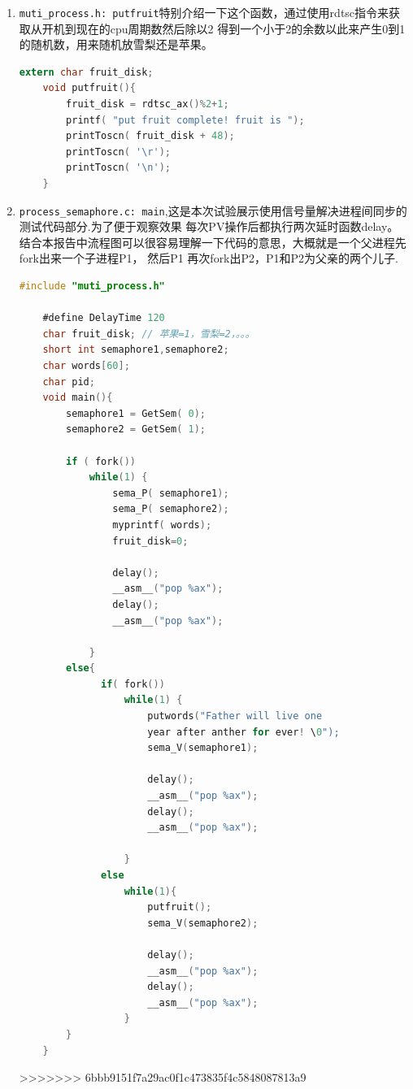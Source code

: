\documentclass[a4paper]{article}
\begin{document}
{\begin{enumerate}
{\begin{lstlisting}[language={C}]
		__asm__("jmp *%bx");  //back to os_syscall callrun
	}
 	\end{lstlisting}}
	\item \verb|muti_process.h: putfruit|特别介绍一下这个函数，通过使用rdtsc指令来获取从开机到现在的cpu周期数然后除以2
	得到一个小于2的余数以此来产生0到1的随机数，用来随机放雪梨还是苹果。
	{\scriptsize\begin{lstlisting}[language={C}]
	extern char fruit_disk;
	void putfruit(){
		fruit_disk = rdtsc_ax()%2+1;
		printf( "put fruit complete! fruit is ");
		printToscn( fruit_disk + 48);
		printToscn( '\r');
		printToscn( '\n');
	}
 	\end{lstlisting}}
	\item \verb|process_semaphore.c: main|,这是本次试验展示使用信号量解决进程间同步的测试代码部分.为了便于观察效果
	每次PV操作后都执行两次延时函数delay。结合本报告中流程图可以很容易理解一下代码的意思，大概就是一个父进程先fork出来一个子进程P1，
	然后P1 再次fork出P2，P1和P2为父亲的两个儿子.
	{\scriptsize\begin{lstlisting}[language={C}]
	#include "muti_process.h"

	#define DelayTime 120
	char fruit_disk; // 苹果=1，雪梨=2，。。。
	short int semaphore1,semaphore2;
	char words[60];
	char pid;
	void main(){
	    semaphore1 = GetSem( 0);
	    semaphore2 = GetSem( 1);

	    if ( fork())
			while(1) {
				sema_P( semaphore1);
				sema_P( semaphore2);
				myprintf( words);
				fruit_disk=0;

				delay();
				__asm__("pop %ax");
				delay();
				__asm__("pop %ax");

			}
		else{
			  if( fork())
				  while(1) {
					  putwords("Father will live one 
					  year after anther for ever! \0");
					  sema_V(semaphore1);

					  delay();
					  __asm__("pop %ax");
					  delay();
					  __asm__("pop %ax");

				  }
			  else
				  while(1){
					  putfruit();
					  sema_V(semaphore2);

					  delay();
					  __asm__("pop %ax");
					  delay();
					  __asm__("pop %ax");
				  }
		}
	}
 	\end{lstlisting}}

>>>>>>> 6bbb9151f7a29ac0f1c473835f4c5848087813a9
 \end{enumerate}
}
\end{document}
